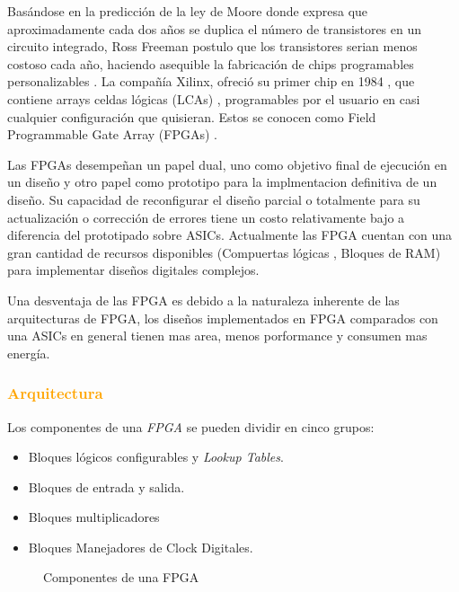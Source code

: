 \documentclass[a4paper,11pt]{article}
\begin{document}
Basándose en la predicción de la ley de Moore donde expresa que aproximadamente cada dos años se duplica el número de transistores en un circuito integrado\cite{Etiqueta01}, Ross Freeman postulo que los transistores serian menos costoso cada año, haciendo asequible la fabricación de chips programables personalizables \cite{Etiqueta03}.
La compañía Xilinx, ofreció su primer chip en 1984 , que contiene arrays celdas lógicas (LCAs) , programables por el usuario en casi cualquier configuración que quisieran. Estos se conocen como Field Programmable Gate Array (FPGAs) .

Las FPGAs desempeñan un papel dual, uno como objetivo final de ejecución en un diseño y otro papel como prototipo para la implmentacion definitiva de un diseño. Su capacidad de reconfigurar el diseño parcial o totalmente para su actualización o corrección de errores tiene un costo relativamente bajo a diferencia del prototipado sobre ASICs.
Actualmente las FPGA cuentan con una gran cantidad de recursos disponibles (Compuertas lógicas , Bloques de RAM) para implementar diseños digitales complejos.

Una desventaja de las FPGA  es debido a la naturaleza inherente de las arquitecturas de FPGA, los diseños implementados en FPGA comparados con una ASICs en general tienen mas area, menos porformance y consumen mas energía.

		\subsubsection{\textcolor{orange}{Arquitectura}}	

Los componentes de una \textit{FPGA} se pueden dividir en cinco grupos:

\begin {itemize}
\item  Bloques lógicos configurables y \textit{Lookup Tables}.
\item  Bloques de entrada y salida.
\item  Bloques multiplicadores
\item  Bloques Manejadores de Clock Digitales.
 \end {itemize}

\begin{figure}[h!]
 \begin{center}
  \caption{Componentes de una FPGA}
  \label{fig:esquema}
 \end{center}
\end{figure}
\end{document}
